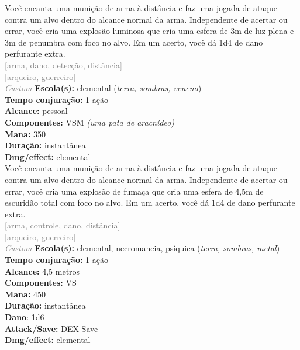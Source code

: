 \documentclass{RPG_Adventure}[2021/10/20]
\begin{document}
{\normalsize Você encanta uma munição de arma à distância e faz uma jogada de ataque contra um alvo dentro do alcance normal da arma. Independente de acertar ou errar, você cria uma explosão luminosa que cria uma esfera de 3m de luz plena e 3m de penumbra com foco no alvo. Em um acerto, você dá 1d4 de dano perfurante extra.\\}
{\scriptsize \textcolor{gray}{[arma, dano, detecção, distância]\\}}
{\scriptsize \textcolor{gray}{[arqueiro, guerreiro]\\}}
{\tiny \textcolor{gray}{\textit{Custom}}}\jump{}
{\small \t \textbf{Escola(s):} elemental (\textit{terra, sombras, veneno})\\\t \textbf{Tempo conjuração:} 1 ação\\\t \textbf{Alcance:} pessoal\\\t \textbf{Componentes:} VSM \textit{(uma pata de aracnídeo)}\\\t \textbf{Mana:} 350\\\t \textbf{Duração:} instantânea\\\t \textbf{Dmg/effect:} elemental\\}
{\normalsize Você encanta uma munição de arma à distância e faz uma jogada de ataque contra um alvo dentro do alcance normal da arma. Independente de acertar ou errar, você cria uma explosão de fumaça que cria uma esfera de 4,5m de escuridão total com foco no alvo. Em um acerto, você dá 1d4 de dano perfurante extra.\\}
{\scriptsize \textcolor{gray}{[arma, controle, dano, distância]\\}}
{\scriptsize \textcolor{gray}{[arqueiro, guerreiro]\\}}
{\tiny \textcolor{gray}{\textit{Custom}}}\jump{}
{\small \t \textbf{Escola(s):} elemental, necromancia, psíquica (\textit{terra, sombras, metal})\\\t \textbf{Tempo conjuração:} 1 ação\\\t \textbf{Alcance:} 4,5 metros\\\t \textbf{Componentes:} VS\\\t \textbf{Mana:} 450\\\t \textbf{Duração:} instantânea\\\t \textbf{Dano}: 1d6\\\t \textbf{Attack/Save:} DEX Save\\\t \textbf{Dmg/effect:} elemental\\}
\end{document}
